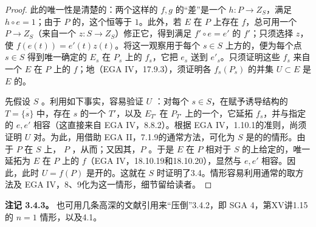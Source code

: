 \begin{proof}
此的唯一性是清楚的：两个这样的 $f,g$ 的“差”是一个 $h:P\to Z_S$，满足 $h\circ e=1$；由于 $P$ 的，这个恒等于 $1$。此外，若 $E$ 在 $P$ 上存在 $f$，总可用一个 $P\to Z_S$（来自一个 $z:S\to Z_S$）修正它，得到满足 $f'\circ e=e'$ 的 $f'$；只须选择 $z$，使 $f(e(t))=e'(t)z(t)$。将这一观察用于每个 $s\in S$ 上方的，便为每个点 $s\in S$ 得到唯一确定的 $E_s$ 在 $P_s$ 上的 $f_s$，它把 $e_s$ 送到 $e'_s$。只须证明这些 $f_s$ 来自一个 $E$ 在 $P$ 上的 $f$；地（EGA IV，17.9.3），须证明各 $f_s(P_s)$ 的并集 $U\subset E$ 是 $E$ 的。

先假设 $S$ 。利用如下事实，容易验证 $U$ ：对每个 $s\in S$，在赋予诱导结构的 $T=\overline{\{s\}}$ 中，存在 $s$ 的一个 $T'$，以及 $E_{T'}$ 在 $P_{T'}$ 上的一个，它延拓 $f_s$，并与指定的 $e,e'$ 相容（这直接来自 EGA IV，8.8.2）。根据 EGA IV，1.10.1的准则，尚须证明 $U$ 对。为此，用借助 EGA II，7.1.9的通常方法，可化为 $S$ 是的的情形。由于 $P$ 在 $S$ 上，
$P$ ，从而；又因其，$P$ 。于是 $E$ 在 $P$ 相对于 $S$ 的上给定的，唯一延拓为 $E$ 在 $P$ 上的 $f$（EGA IV，18.10.19和18.10.20），显然与 $e,e'$ 相容。因此，此时 $U=f(P)$ 是开的。这就在 $S$ 时证明了3.4。情形容易利用通常的取方法及 EGA IV，8、9化为这一情形，细节留给读者。
\end{proof}
\textbf{注记 3.4.3。} 也可用几条高深的文献引用来“压倒”3.4.2，即 SGA 4，第XV讲1.15的 $n=1$ 情形，以及4.1。

